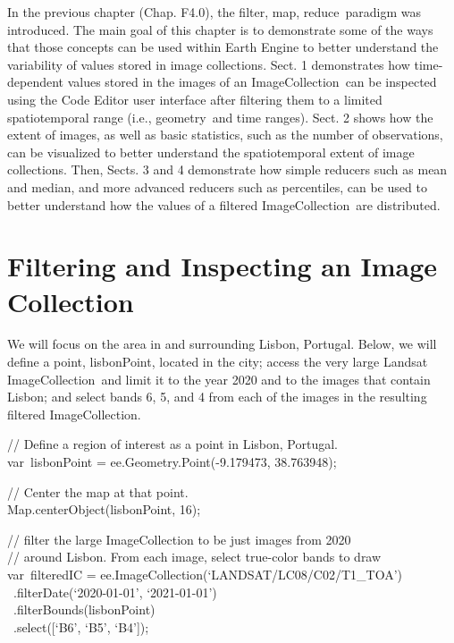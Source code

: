 \documentclass[
  letterpaper,
  DIV=11,
  numbers=noendperiod]{scrreprt}
\begin{document}
In the previous chapter (Chap. F4.0), the filter, map, reduce~paradigm
was introduced. The main goal of this chapter is to demonstrate some of
the ways that those concepts can be used within Earth Engine to better
understand the variability of values stored in image collections. Sect.
1 demonstrates how time-dependent values stored in the images of an
ImageCollection~can be inspected using the Code Editor user interface
after filtering them to a limited spatiotemporal range (i.e.,
geometry~and time ranges). Sect. 2 shows how the extent of images, as
well as basic statistics, such as the number of observations, can be
visualized to better understand the spatiotemporal extent of image
collections. Then, Sects. 3 and 4 demonstrate how simple reducers such
as mean and median, and more advanced reducers such as percentiles, can
be used to better understand how the values of a filtered
ImageCollection~are distributed.

\hypertarget{filtering-and-inspecting-an-image-collection}{%
\section{Filtering and Inspecting an Image
Collection}\label{filtering-and-inspecting-an-image-collection}}

We will focus on the area in and surrounding Lisbon, Portugal. Below, we
will define a point, lisbonPoint, located in the city; access the very
large Landsat ImageCollection~and limit it to the year 2020 and to the
images that contain Lisbon; and select bands 6, 5, and 4 from each of
the images in the resulting filtered ImageCollection.

// Define a region of interest as a point in Lisbon, Portugal.\\
var~lisbonPoint = ee.Geometry.Point(-9.179473, 38.763948);

// Center the map at that point.\\
Map.centerObject(lisbonPoint, 16);

// filter the large ImageCollection to be just images from 2020\\
// around Lisbon. From each image, select true-color bands to draw\\
var~filteredIC = ee.ImageCollection(`LANDSAT/LC08/C02/T1\_TOA')\\
\hspace*{0.333em} ~.filterDate(`2020-01-01', `2021-01-01')\\
\hspace*{0.333em} ~.filterBounds(lisbonPoint)\\
\hspace*{0.333em} ~.select({[}`B6', `B5', `B4'{]});
\end{document}

